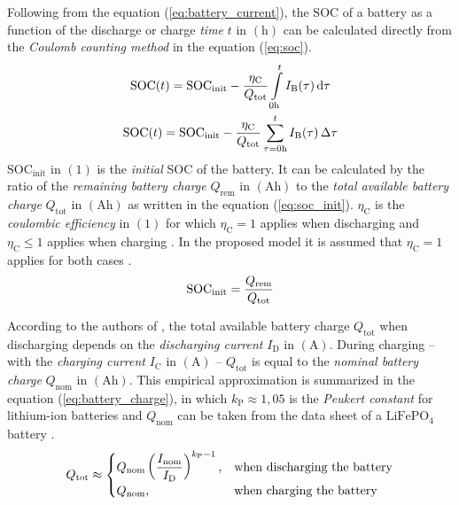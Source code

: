 Following from the equation (\ref{eq:battery_current}), the $\mathrm{SOC}$ of a battery as a function of the discharge or charge \emph{time} $t$ in $\left(\mathrm{h}\right)$ can be calculated directly from the \emph{Coulomb counting method} in the equation (\ref{eq:soc}). 
	\begin{equation} \label{eq:soc}
		\centering
		\begin{gathered}
		\mathrm{SOC}(t) = \mathrm{SOC}_\mathrm{init} - \dfrac{\eta_\mathrm{C}}{Q_\mathrm{tot}} \int\limits_{0\mathrm{h}}^{t} I_\mathrm{B}(\tau) \,\mathrm{d}\tau \\
		\mathrm{SOC}(t) = \mathrm{SOC}_\mathrm{init} - \dfrac{\eta_\mathrm{C}}{Q_\mathrm{tot}} \displaystyle\sum_{\tau = 0\mathrm{h}}^{t} I_\mathrm{B}(\tau) \, \Delta \tau
		\end{gathered}
	\end{equation} 
$\mathrm{SOC}_\mathrm{init}$ in $\left(1\right)$ is the \emph{initial} SOC of the battery. It can be calculated by the ratio of the \emph{remaining battery charge} $Q_\mathrm{rem}$ in $\left(\mathrm{Ah}\right)$ to the \emph{total available battery charge} $Q_\mathrm{tot}$ in $\left(\mathrm{Ah}\right)$ as written in the equation (\ref{eq:soc_init}). $\eta_\mathrm{C}$ is the \emph{coulombic efficiency} in $\left(1\right)$ for which $\eta_\mathrm{C} = 1$ applies when discharging and $\eta_\mathrm{C} \leq 1$ applies when charging \cite{He:2011, Wehbe:2015, Nejad:2016, Kurzweil:2018, Li:2018}. In the proposed model it is assumed that $\eta_\mathrm{C} = 1$ applies for both cases \cite{Hentunen:2014, Hinz:2019,Gurjer:2019}.
	\begin{equation} \label{eq:soc_init}
	\centering
		\mathrm{SOC}_\mathrm{init} = \dfrac{Q_\mathrm{rem}}{Q_\mathrm{tot}}
	\end{equation}

According to the authors of \cite{Hausmann:2013, Kurzweil:2018, Saldana:2019}, the total available battery charge $Q_\mathrm{tot}$ when discharging depends on the \emph{discharging current} $I_\mathrm{D}$ in $\left(\mathrm{A}\right)$. During charging -- with the \emph{charging current} $I_\mathrm{C}$ in $\left(\mathrm{A}\right)$ -- $Q_\mathrm{tot}$ is equal to the \emph{nominal battery charge} $Q_\mathrm{nom}$ in $\left(\mathrm{Ah}\right)$. This empirical approximation is summarized in the equation (\ref{eq:battery_charge}), in which $k_\mathrm{P} \approx 1,05$ is the \emph{Peukert constant} for lithium-ion batteries and $Q_\mathrm{nom}$ can be taken from the data sheet of a $\mathrm{LiFePO}_4$ battery \cite{Hausmann:2013, Kurzweil:2018}.
	\begin{equation} \label{eq:battery_charge}
	\centering
		Q_\mathrm{tot} \approx
  		\begin{cases}
   			Q_\mathrm{nom} \left(\dfrac{I_\mathrm{nom}}{I_\mathrm{D}}\right)^{k_\mathrm{P} - 1} \text{,} & \text{when discharging the battery} \\
    		Q_\mathrm{nom}\text{,} & \text{when charging the battery}
  		\end{cases}
	\end{equation} 
	
